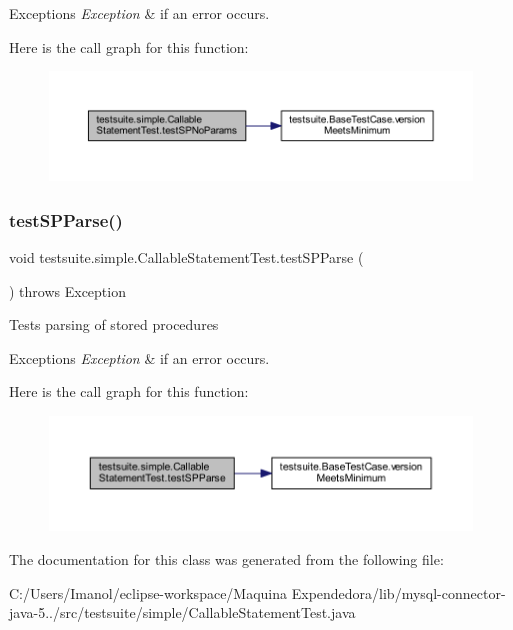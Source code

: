 \begin{DoxyExceptions}{Exceptions}
{\em Exception} & if an error occurs. \\
\hline
\end{DoxyExceptions}
Here is the call graph for this function\+:
\nopagebreak
\begin{figure}[H]
\begin{center}
\leavevmode
\includegraphics[width=350pt]{classtestsuite_1_1simple_1_1_callable_statement_test_a5382df497dce2b6ecd935d4550a5b505_cgraph}
\end{center}
\end{figure}
\mbox{\label{classtestsuite_1_1simple_1_1_callable_statement_test_ad2d1ffaddb39bf287b37661e592ef2f6}} 
\subsubsection{\texorpdfstring{test\+S\+P\+Parse()}{testSPParse()}}
{\footnotesize\ttfamily void testsuite.\+simple.\+Callable\+Statement\+Test.\+test\+S\+P\+Parse (\begin{DoxyParamCaption}{ }\end{DoxyParamCaption}) throws Exception}

Tests parsing of stored procedures


\begin{DoxyExceptions}{Exceptions}
{\em Exception} & if an error occurs. \\
\hline
\end{DoxyExceptions}
Here is the call graph for this function\+:
\nopagebreak
\begin{figure}[H]
\begin{center}
\leavevmode
\includegraphics[width=350pt]{classtestsuite_1_1simple_1_1_callable_statement_test_ad2d1ffaddb39bf287b37661e592ef2f6_cgraph}
\end{center}
\end{figure}


The documentation for this class was generated from the following file\+:\begin{DoxyCompactItemize}
\item 
C\+:/\+Users/\+Imanol/eclipse-\/workspace/\+Maquina Expendedora/lib/mysql-\/connector-\/java-\/5../src/testsuite/simple/Callable\+Statement\+Test.\+java\end{DoxyCompactItemize}
